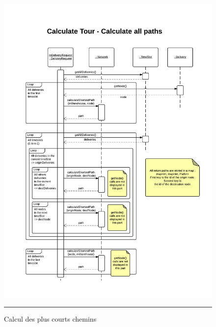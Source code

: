\begin{figure}[H]
	\centering
		\includegraphics[width=\textwidth,height=\textheight,keepaspectratio]{Figures/calcul_tournee2}
		\rule{35em}{0.5pt}
	\caption[Calcul des plus courts chemins]{Calcul des plus courts chemins}
\end{figure}

